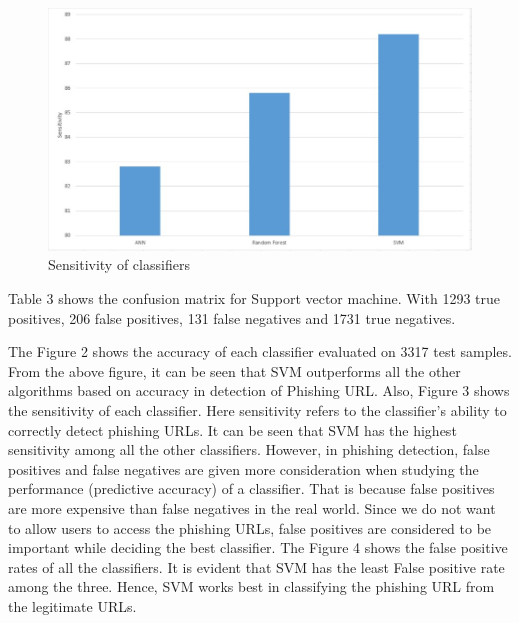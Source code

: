 \documentclass[conference]{IEEEtran}
\begin{document}
\begin{figure}
    \centering
    \includegraphics[width=\linewidth]{Fig3.jpg}
    \caption{Sensitivity of classifiers}
    \label{fig:3}
\end{figure}
\par Table 3 shows the confusion matrix for Support vector
machine. With 1293 true positives, 206 false positives, 131
false negatives and 1731 true negatives.
\par The Figure 2 shows the accuracy of each classifier evaluated
on 3317 test samples. From the above figure, it can be
seen that SVM outperforms all the other algorithms based on
accuracy in detection of Phishing URL. Also, Figure 3 shows
the sensitivity of each classifier. Here sensitivity refers to the
classifier’s ability to correctly detect phishing URLs. It can be
seen that SVM has the highest sensitivity among all the other
classifiers. However, in phishing detection, false positives and
false negatives are given more consideration when studying
the performance (predictive accuracy) of a classifier. That is
because false positives are more expensive than false negatives
in the real world. Since we do not want to allow users to
access the phishing URLs, false positives are considered to
be important while deciding the best classifier. The Figure 4
shows the false positive rates of all the classifiers. It is evident
that SVM has the least False positive rate among the three.
Hence, SVM works best in classifying the phishing URL from
the legitimate URLs.
\end{document}
